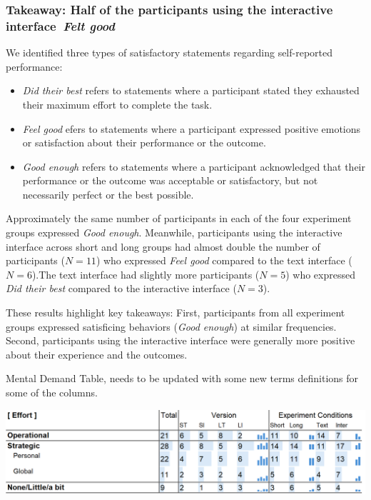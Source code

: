 \subsubsection{Takeaway: Half of the participants using the interactive interface~\textit{Felt good}}
We identified three types of satisfactory statements regarding self-reported performance:
\begin{itemize}
    \item \textit{Did their best} refers to statements where a participant stated they exhausted their maximum effort to complete the task.
    \item \textit{Feel good} efers to statements where a participant expressed positive emotions or satisfaction about their performance or the outcome.
    \item \textit{Good enough} refers to statements where a participant acknowledged that their performance or the outcome was acceptable or satisfactory, but not necessarily perfect or the best possible.
\end{itemize}

Approximately the same number of participants in each of the four experiment groups expressed \textit{Good enough}. Meanwhile, participants using the interactive interface across short and long groups had almost double the number of participants ($N=11$) who expressed \textit{Feel good} compared to the text interface ($N=6$).The text interface had slightly more participants ($N=5$) who expressed \textit{Did their best} compared to the interactive interface ($N=3$).

These results highlight key takeaways: First, participants from all experiment groups expressed satisficing behaviors (\textit{Good enough}) at similar frequencies. Second, participants using the interactive interface were generally more positive about their experience and the outcomes.



\begin{table}[h]
    \caption{Mental Demand Table, needs to be updated with some new terms definitions for some of the columns.}
    \label{tbl:physical}
    \includegraphics[width=\linewidth]{content/image/cog/effort_table.png}
\end{table}

